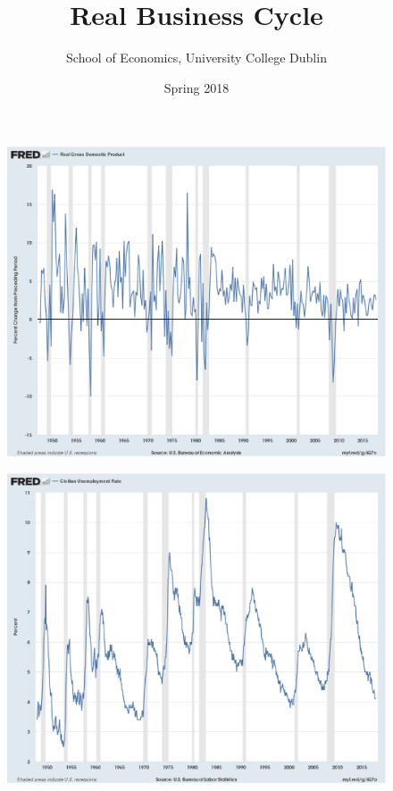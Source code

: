 \documentclass{beamer}
\title{Real Business Cycle}
\author{School of Economics, University College Dublin}
\date{Spring 2018}
\begin{document}
\begin{frame}
 \titlepage
\end{frame}

\begin{frame}
  \begin{figure}
    \includegraphics[scale=.25]{fred.eps}
  \end{figure}
\end{frame}

\begin{frame}
  \begin{figure}
    \includegraphics[scale=.25]{fred2.eps}
  \end{figure}
\end{frame}
\end{document}
